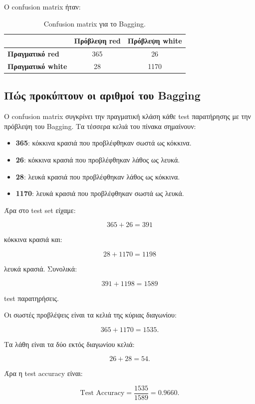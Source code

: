 \documentclass[12pt,a4paper]{article}
\begin{document}
Ο confusion matrix ήταν:

\begin{table}[H]
\centering
\caption{Confusion matrix για το Bagging.}
\begin{tabular}{lcc}
\toprule
& \textbf{Πρόβλεψη red} & \textbf{Πρόβλεψη white} \\
\midrule
\textbf{Πραγματικό red} & 365 & 26 \\
\textbf{Πραγματικό white} & 28 & 1170 \\
\bottomrule
\end{tabular}
\end{table}

\subsection{Πώς προκύπτουν οι αριθμοί του Bagging}

Ο confusion matrix συγκρίνει την πραγματική κλάση κάθε test παρατήρησης με την
πρόβλεψη του Bagging. Τα τέσσερα κελιά του πίνακα σημαίνουν:

\begin{itemize}
    \item \textbf{365}: κόκκινα κρασιά που προβλέφθηκαν σωστά ως κόκκινα.
    \item \textbf{26}: κόκκινα κρασιά που προβλέφθηκαν λάθος ως λευκά.
    \item \textbf{28}: λευκά κρασιά που προβλέφθηκαν λάθος ως κόκκινα.
    \item \textbf{1170}: λευκά κρασιά που προβλέφθηκαν σωστά ως λευκά.
\end{itemize}

Άρα στο test set είχαμε:

\[
    365 + 26 = 391
\]

κόκκινα κρασιά και:

\[
    28 + 1170 = 1198
\]

λευκά κρασιά. Συνολικά:

\[
    391 + 1198 = 1589
\]

test παρατηρήσεις.

Οι σωστές προβλέψεις είναι τα κελιά της κύριας διαγωνίου:

\[
    365 + 1170 = 1535.
\]

Τα λάθη είναι τα δύο εκτός διαγωνίου κελιά:

\[
    26 + 28 = 54.
\]

Άρα η test accuracy είναι:

\[
    \text{Test Accuracy}
    =
    \frac{1535}{1589}
    =
    0.9660.
\]
\end{document}

